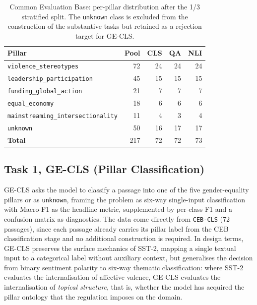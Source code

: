 \documentclass[pdflatex, sn-apa]{sn-jnl}%
\theoremstyle{thmstyleone}%
\theoremstyle{thmstyletwo}%
\theoremstyle{thmstylethree}%
\begin{document}
\begin{table}[h]
\centering
\caption{Common Evaluation Base: per-pillar distribution after the 1/3
stratified split. The \texttt{unknown} class is excluded from the construction of
the substantive tasks but retained as a rejection target for GE-CLS.}
\label{tab:ceb}
\small
\begin{tabular}{@{}lrrrr@{}}
\toprule
Pillar                                & Pool & CLS & QA & NLI \\
\midrule
\texttt{violence\_stereotypes}        & 72   & 24  & 24 & 24  \\
\texttt{leadership\_participation}    & 45   & 15  & 15 & 15  \\
\texttt{funding\_global\_action}      & 21   &  7  &  7 &  7  \\
\texttt{equal\_economy}               & 18   &  6  &  6 &  6  \\
\texttt{mainstreaming\_intersectionality} & 11 & 4  &  3 &  4  \\
\texttt{unknown}                      & 50   & 16  & 17 & 17  \\
\midrule
\textbf{Total}                        & 217  & 72  & 72 & 73  \\
\bottomrule
\end{tabular}
\end{table}

\subsection{Task 1, GE-CLS (Pillar Classification)}
\label{sec:bench:cls}
GE-CLS asks the model to classify a passage into one of the five gender-equality
pillars or as \texttt{unknown}, framing the problem as six-way single-input
classification with Macro-F1 as the headline metric, supplemented by per-class F1
and a confusion matrix as diagnostics. The data come directly from
\texttt{CEB-CLS} (72 passages), since each passage already carries its pillar
label from the CEB classification stage and no additional construction is
required. In design terms, GE-CLS preserves the surface mechanics of SST-2,
mapping a single textual input to a categorical label without auxiliary context,
but generalises the decision from binary sentiment polarity to six-way thematic
classification: where SST-2 evaluates the internalisation of affective valence,
GE-CLS evaluates the internalisation of \emph{topical structure}, that is,
whether the model has acquired the pillar ontology that the regulation imposes on
the domain.
\end{document}
